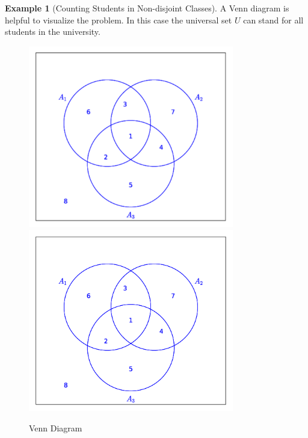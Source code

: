 \documentclass[10pt,]{book}
\theoremstyle{plain}
\theoremstyle{definition}
\newtheorem{example}[theorem]{Example}
\begin{document}
\begin{example}[Counting Students in Non-disjoint Classes]
 A Venn diagram is helpful to visualize the problem. In this case the universal set \(U\)  can stand for 	all students in the university.
%
\leavevmode%
\begin{figure}
\centering
{}%
{\includegraphics[width=0.80\textwidth]{images/sageplot-venn-CS_Students.pdf}}%
{\includegraphics[width=0.80\textwidth]{images/sageplot-venn-CS_Students.png}}
\caption{Venn Diagram\label{venn_diagram_CS_Students}}
\end{figure}
\par


\end{example}
\end{document}
